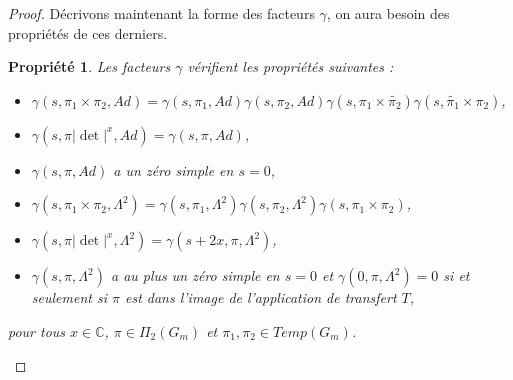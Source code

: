 \documentclass{amsart}
\newtheorem{propriete}{Propriété}[section]
\begin{document}
\begin{proof}
Décrivons maintenant la forme des facteurs $\gamma$, on aura besoin des propriétés de ces derniers.
\begin{propriete}
Les facteurs $\gamma$ vérifient les propriétés suivantes :
\begin{itemize}
\item $\gamma(s, \pi_1 \times \pi_2, Ad) = \gamma(s, \pi_1, Ad)\gamma(s, \pi_2, Ad) \gamma(s, \pi_1 \times \widetilde{\pi_2}) \gamma(s, \widetilde{\pi_1} \times \pi_2)$,
\item $\gamma(s, \pi |\det |^x, Ad) = \gamma(s, \pi, Ad)$,
\item $\gamma(s, \pi, Ad)$ a un zéro simple en $s=0$,
\item $\gamma(s, \pi_1 \times \pi_2, \Lambda^2) = \gamma(s, \pi_1, \Lambda^2) \gamma(s, \pi_2, \Lambda^2) \gamma(s, \pi_1 \times \pi_2)$,
\item $\gamma(s, \pi |\det |^x, \Lambda^2) = \gamma(s + 2x, \pi, \Lambda^2)$,
\item $\gamma(s, \pi, \Lambda^2)$ a au plus un zéro simple en $s=0$ et $\gamma(0, \pi, \Lambda^2) = 0$ si et seulement si $\pi$ est dans l'image de l'application de transfert $T$,
\end{itemize}
pour tous $x \in \mathbb{C}$, $\pi \in \Pi_2(G_m)$ et $\pi_1, \pi_2 \in Temp(G_m)$.
\end{propriete}


\end{proof}
\end{document}
